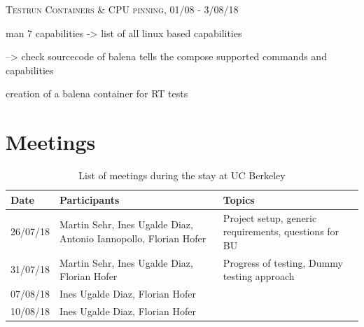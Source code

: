 \documentclass[]{scrartcl}
\begin{document}
{\small\textsc{Testrun Containers \& CPU pinning, 01/08 - 3/08/18} \bigskip}



man 7 capabilities  -> list of all linux based capabilities


--> check sourcecode of balena tells the compose supported commands and capabilities

creation of a balena container for RT tests


\section{Meetings}

\begin{table}
	\centering
	\caption{List of meetings during the stay at UC Berkeley}
	
	\begin{tabular}{l l l}
	Date & Participants & Topics \\
	\hline
	26/07/18 & Martin Sehr, Ines Ugalde Diaz, Antonio Iannopollo, Florian Hofer & Project setup, generic requirements, questions for BU\\
	31/07/18 & Martin Sehr, Ines Ugalde Diaz, Florian Hofer & Progress of testing, Dummy testing approach\\
	07/08/18 & Ines Ugalde Diaz, Florian Hofer & \\
	10/08/18 & Ines Ugalde Diaz, Florian Hofer & \\
	\hline
	\end{tabular}
	
	\label{tab:meeting}
\end{table}
\end{document}
